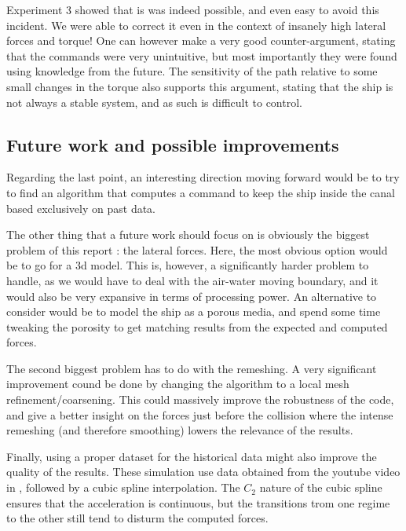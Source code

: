 \documentclass[a4paper]{article}
\begin{document}
Experiment 3 showed that is was indeed possible, and even easy to avoid this incident. We were able to correct it even in the context of insanely high lateral forces and torque! One can however make a very good counter-argument, stating that the commands were very unintuitive, but most importantly they were found using knowledge from the future. The sensitivity of the path relative to some small changes in the torque also supports this argument, stating that the ship is not always a stable system, and as such is difficult to control.

\subsection{Future work and possible improvements}
Regarding the last point, an interesting direction moving forward would be to try to find an algorithm that computes a command to keep the ship inside the canal based exclusively on past data.

The other thing that a future work should focus on is obviously the biggest problem of this report : the lateral forces. Here, the most obvious option would be to go for a 3d model. This is, however, a significantly harder problem to handle, as we would have to deal with the air-water moving boundary, and it would also be very expansive in terms of processing power. An alternative to consider would be to model the ship as a porous media, and spend some time tweaking the porosity to get matching results from the expected and computed forces.

The second biggest problem has to do with the remeshing. A very significant improvement cound be done by changing the algorithm to a local mesh refinement/coarsening. This could massively improve the robustness of the code, and give a better insight on the forces just before the collision where the intense remeshing (and therefore smoothing) lowers the relevance of the results.

Finally, using a proper dataset for the historical data might also improve the quality of the results. These simulation use data obtained from the youtube video in \cite{goodvideo}, followed by a cubic spline interpolation. The $C_2$ nature of the cubic spline ensures that the acceleration is continuous, but the transitions trom one regime to the other still tend to disturm the computed forces.



\newpage


\end{document}
